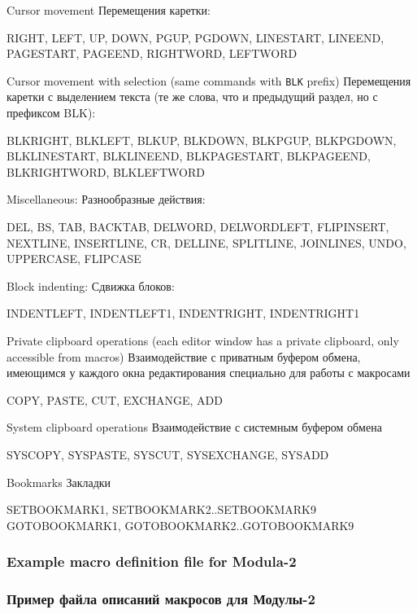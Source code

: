 \ifenglish
Cursor movement
\else
Перемещения каретки:
\fi

RIGHT, LEFT, UP, DOWN, PGUP, PGDOWN, LINESTART, LINEEND, PAGESTART, PAGEEND, RIGHTWORD, LEFTWORD

\ifenglish
Cursor movement with selection (same commands with \verb'BLK' prefix)
\else
Перемещения каретки с выделением текста (те же слова, что и предыдущий раздел, но с префиксом BLK):
\fi

BLKRIGHT, BLKLEFT, BLKUP, BLKDOWN, BLKPGUP, BLKPGDOWN, BLKLINESTART, BLKLINEEND, BLKPAGESTART, BLKPAGEEND, BLKRIGHTWORD, BLKLEFTWORD

\ifenglish
Miscellaneous:
\else
Разнообразные действия:
\fi

DEL, BS, TAB, BACKTAB, DELWORD, DELWORDLEFT, FLIPINSERT, NEXTLINE, INSERTLINE, CR, DELLINE, SPLITLINE, JOINLINES, UNDO, UPPERCASE, FLIPCASE

\ifenglish
Block indenting:
\else
Сдвижка блоков:
\fi

INDENTLEFT, INDENTLEFT1, INDENTRIGHT, INDENTRIGHT1

\ifenglish
Private clipboard operations (each editor window has a private clipboard, only accessible from macros)
\else
Взаимодействие с приватным буфером обмена, имеющимся у каждого окна редактирования специально для работы с макросами
\fi

COPY, PASTE, CUT, EXCHANGE, ADD

\ifenglish
System clipboard operations
\else
Взаимодействие с системным буфером обмена
\fi

SYSCOPY, SYSPASTE, SYSCUT, SYSEXCHANGE, SYSADD

\ifenglish
Bookmarks
\else
Закладки
\fi

SETBOOKMARK1, SETBOOKMARK2..SETBOOKMARK9 \\
GOTOBOOKMARK1, GOTOBOOKMARK2..GOTOBOOKMARK9

\ifenglish
\subsubsection{Example macro definition file for Modula-2}
\else
\subsubsection{Пример файла описаний макросов для Модулы-2}
\fi

